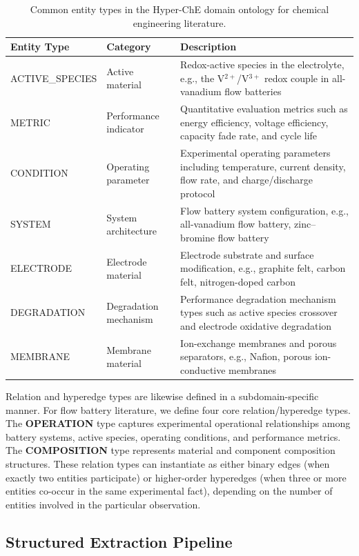 \begin{table}[htbp]
\centering
\caption{Common entity types in the Hyper-ChE domain ontology for chemical engineering literature.}
\label{tab:entity-types}
\begin{tabular}{@{}p{2.8cm}p{2.2cm}p{7.8cm}@{}}
\toprule
\textbf{Entity Type} & \textbf{Category} & \textbf{Description} \\
\midrule
ACTIVE\_SPECIES & Active material & Redox-active species in the electrolyte, e.g., the V$^{2+}$/V$^{3+}$ redox couple in all-vanadium flow batteries \\
METRIC & Performance indicator & Quantitative evaluation metrics such as energy efficiency, voltage efficiency, capacity fade rate, and cycle life \\
CONDITION & Operating parameter & Experimental operating parameters including temperature, current density, flow rate, and charge/discharge protocol \\
SYSTEM & System architecture & Flow battery system configuration, e.g., all-vanadium flow battery, zinc--bromine flow battery \\
ELECTRODE & Electrode material & Electrode substrate and surface modification, e.g., graphite felt, carbon felt, nitrogen-doped carbon \\
DEGRADATION & Degradation mechanism & Performance degradation mechanism types such as active species crossover and electrode oxidative degradation \\
MEMBRANE & Membrane material & Ion-exchange membranes and porous separators, e.g., Nafion, porous ion-conductive membranes \\
\bottomrule
\end{tabular}
\end{table}

Relation and hyperedge types are likewise defined in a subdomain-specific manner. For flow battery literature, we define four core relation/hyperedge types. The \textbf{OPERATION} type captures experimental operational relationships among battery systems, active species, operating conditions, and performance metrics. The \textbf{COMPOSITION} type represents material and component composition structures. These relation types can instantiate as either binary edges (when exactly two entities participate) or higher-order hyperedges (when three or more entities co-occur in the same experimental fact), depending on the number of entities involved in the particular observation.

\subsection{Structured Extraction Pipeline}
\label{subsec:extraction}

